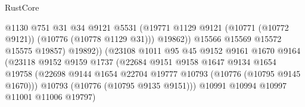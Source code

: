 \begin{lexlean}{RustCore}
\begin{coremodule}
                                              @1130
                                              @751
                                              @31
                                              @34
                                              @9121
                                              @5531
                                              (@19771
                                                @1129
                                                @9121
                                                (@10771 (@10772 @9121))
                                                (@10776 (@10778 @1129 @31)))
                                              @19862))
                                          @15566
                                          @15569
                                          @15572
                                          @15575
                                          @19857)
                                        @19892))
                                    (@23108
                                      @1011
                                      @95
                                      @45
                                      @9152
                                      @9161
                                      @1670
                                      @9164
                                      (@23118
                                        @9152
                                        @9159
                                        @1737
                                        (@22684
                                          @9151
                                          @9158
                                          @1647
                                          @9134
                                          @1654
                                          @19758
                                          (@22698
                                            @9144
                                            @1654
                                            @22704
                                            @19777
                                            @10793
                                            (@10776 (@10795 @9145 @1670)))
                                          @10793
                                          (@10776 (@10795 @9135 @9151)))
                                        @10991
                                        @10994
                                        @10997
                                        @11001
                                        @11006
                                        @19797)

\end{coremodule}
\end{lexlean}
